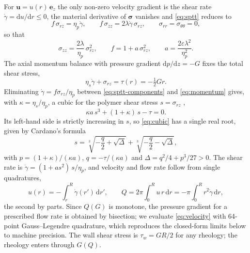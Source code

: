 For $\boldsymbol{u}=u(r)\,\boldsymbol{e}_z$ the only non-zero velocity
gradient is the shear rate $\dot\gamma=\mathrm{d}u/\mathrm{d}r\le 0$, the
material derivative of $\boldsymbol{\sigma}$ vanishes and
\eqref{eq:sptt} reduces to
\begin{equation}
  f\,\sigma_{rz} = \eta_p\dot\gamma, \qquad
  f\,\sigma_{zz} = 2\lambda\dot\gamma\,\sigma_{rz}, \qquad
  \sigma_{rr}=\sigma_{\theta\theta}=0 ,
  \label{eq:sptt-components}
\end{equation}
so that
\begin{equation}
  \sigma_{zz} = \frac{2\lambda}{\eta_p}\,\sigma_{rz}^2, \qquad
  f = 1 + a\,\sigma_{rz}^2, \qquad a = \frac{2\varepsilon\lambda^2}{\eta_p^2}.
  \label{eq:sptt-normal}
\end{equation}
The axial momentum balance with pressure gradient $\mathrm{d}p/\mathrm{d}z=-G$
fixes the total shear stress,
\begin{equation}
  \eta_s\dot\gamma + \sigma_{rz} = \tau(r) = -\tfrac12 G r .
  \label{eq:momentum}
\end{equation}
Eliminating $\dot\gamma=f\sigma_{rz}/\eta_p$ between
\eqref{eq:sptt-components} and \eqref{eq:momentum} gives, with
$\kappa=\eta_s/\eta_p$, a cubic for the polymer shear stress
$s=\sigma_{rz}$ \citep{Cruz2005},
\begin{equation}
  \kappa a\, s^3 + (1+\kappa)\, s - \tau = 0 .
  \label{eq:cubic}
\end{equation}
Its left-hand side is strictly increasing in $s$, so \eqref{eq:cubic} has a
single real root, given by Cardano's formula
\begin{equation}
  s = \sqrt[3]{-\frac{q}{2}+\sqrt{\Delta}} + \sqrt[3]{-\frac{q}{2}-\sqrt{\Delta}},
  \label{eq:cardano}
\end{equation}
with
$p = (1+\kappa)/(\kappa a)$, $q = -\tau/(\kappa a)$ and
$\Delta = q^2/4 + p^3/27 > 0$.
The shear rate is $\dot\gamma = (1+a s^2)\,s/\eta_p$, and velocity and flow rate
follow from single quadratures,
\begin{equation}
  u(r) = -\int_r^R \dot\gamma(r')\,\mathrm{d}r', \qquad
  Q = 2\pi\int_0^R u\,r\,\mathrm{d}r = -\pi\int_0^R r^2\dot\gamma\,\mathrm{d}r ,
  \label{eq:velocity}
\end{equation}
the second by parts. Since $Q(G)$ is monotone, the pressure gradient for a
prescribed flow rate is obtained by bisection; we evaluate
\eqref{eq:velocity} with 64-point Gauss--Legendre quadrature, which reproduces
the closed-form limits below to machine precision. The wall shear stress is
$\tau_w = GR/2$ for any rheology; the rheology enters through $G(Q)$.


